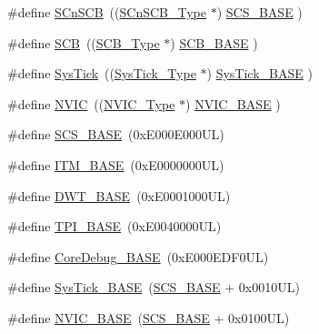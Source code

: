 \begin{DoxyCompactItemize}
\item 
\#define \hyperlink{group___c_m_s_i_s__core__base_ga9fe0cd2eef83a8adad94490d9ecca63f}{S\+Cn\+S\+CB}~((\hyperlink{struct_s_cn_s_c_b___type}{S\+Cn\+S\+C\+B\+\_\+\+Type}    $\ast$)     \hyperlink{group___c_m_s_i_s__core__base_ga3c14ed93192c8d9143322bbf77ebf770}{S\+C\+S\+\_\+\+B\+A\+SE}      )
\item 
\#define \hyperlink{group___c_m_s_i_s__core__base_gaaaf6477c2bde2f00f99e3c2fd1060b01}{S\+CB}~((\hyperlink{struct_s_c_b___type}{S\+C\+B\+\_\+\+Type}       $\ast$)     \hyperlink{group___c_m_s_i_s__core__base_gad55a7ddb8d4b2398b0c1cfec76c0d9fd}{S\+C\+B\+\_\+\+B\+A\+SE}      )
\item 
\#define \hyperlink{group___c_m_s_i_s__core__base_gacd96c53beeaff8f603fcda425eb295de}{Sys\+Tick}~((\hyperlink{struct_sys_tick___type}{Sys\+Tick\+\_\+\+Type}   $\ast$)     \hyperlink{group___c_m_s_i_s__core__base_ga58effaac0b93006b756d33209e814646}{Sys\+Tick\+\_\+\+B\+A\+SE}  )
\item 
\#define \hyperlink{group___c_m_s_i_s__core__base_gac8e97e8ce56ae9f57da1363a937f8a17}{N\+V\+IC}~((\hyperlink{struct_n_v_i_c___type}{N\+V\+I\+C\+\_\+\+Type}      $\ast$)     \hyperlink{group___c_m_s_i_s__core__base_gaa0288691785a5f868238e0468b39523d}{N\+V\+I\+C\+\_\+\+B\+A\+SE}     )
\item 
\#define \hyperlink{group___c_m_s_i_s__core__base_ga3c14ed93192c8d9143322bbf77ebf770}{S\+C\+S\+\_\+\+B\+A\+SE}~(0x\+E000\+E000\+U\+L)
\item 
\#define \hyperlink{group___c_m_s_i_s__core__base_gadd76251e412a195ec0a8f47227a8359e}{I\+T\+M\+\_\+\+B\+A\+SE}~(0x\+E0000000\+U\+L)
\item 
\#define \hyperlink{group___c_m_s_i_s__core__base_gafdab534f961bf8935eb456cb7700dcd2}{D\+W\+T\+\_\+\+B\+A\+SE}~(0x\+E0001000\+U\+L)
\item 
\#define \hyperlink{group___c_m_s_i_s__core__base_ga2b1eeff850a7e418844ca847145a1a68}{T\+P\+I\+\_\+\+B\+A\+SE}~(0x\+E0040000\+U\+L)
\item 
\#define \hyperlink{group___c_m_s_i_s__core__base_ga680604dbcda9e9b31a1639fcffe5230b}{Core\+Debug\+\_\+\+B\+A\+SE}~(0x\+E000\+E\+D\+F0\+U\+L)
\item 
\#define \hyperlink{group___c_m_s_i_s__core__base_ga58effaac0b93006b756d33209e814646}{Sys\+Tick\+\_\+\+B\+A\+SE}~(\hyperlink{group___c_m_s_i_s__core__base_ga3c14ed93192c8d9143322bbf77ebf770}{S\+C\+S\+\_\+\+B\+A\+SE} +  0x0010\+U\+L)
\item 
\#define \hyperlink{group___c_m_s_i_s__core__base_gaa0288691785a5f868238e0468b39523d}{N\+V\+I\+C\+\_\+\+B\+A\+SE}~(\hyperlink{group___c_m_s_i_s__core__base_ga3c14ed93192c8d9143322bbf77ebf770}{S\+C\+S\+\_\+\+B\+A\+SE} +  0x0100\+U\+L)

\end{DoxyCompactItemize}
